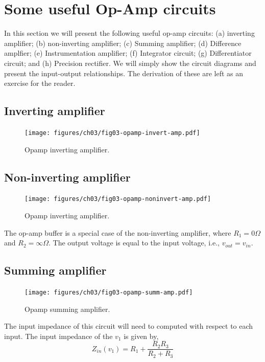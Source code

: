 \section{Some useful Op-Amp circuits}
In this section we will present the following useful op-amp circuits: (a) inverting amplifier; (b) non-inverting amplifier; (c) Summing amplifier; (d) Difference amplfier; (e) Instrumentation amplifier; (f) Integrator circuit; (g) Differentiator circuit; and (h) Precision rectifier. We will simply show the circuit diagrams and present the input-output relationships. The derivation of these are left as an exercise for the reader.

\subsection{Inverting amplifier}
\begin{figure}[htbp]
    \centering
    \texttt{[image: figures/ch03/fig03-opamp-invert-amp.pdf]}
    \caption{Opamp inverting amplifier.}
    \label{fig:03-opamp-inver-amp}
\end{figure}

\subsection{Non-inverting amplifier}

\begin{figure}[htbp]
    \centering
    \texttt{[image: figures/ch03/fig03-opamp-noninvert-amp.pdf]}
    \caption{Opamp inverting amplifier.}
    \label{fig:03-opamp-noninver-amp}
\end{figure}
The op-amp buffer is a special case of the non-inverting amplifier, where $R_1 = 0\Omega$ and $R_2 = \infty\Omega$. The output voltage is equal to the input voltage, i.e., $v_{out} = v_{in}$. 

\subsection{Summing amplifier}
\begin{figure}[htbp]
    \centering
    \texttt{[image: figures/ch03/fig03-opamp-summ-amp.pdf]}
    \caption{Opamp summing amplifier.}
    \label{fig:03-opamp-summ-amp}
\end{figure}
The input impedance of this circuit will need to computed with respect to each input. The input impedance of the $v_1$ is given by,
\begin{equation}
    Z_{in}(v_1) = R_1 + \frac{R_2 R_3}{R_2 + R_3}
    \label{eq:ch03-opamp-summ-amp-rin}
\end{equation}

